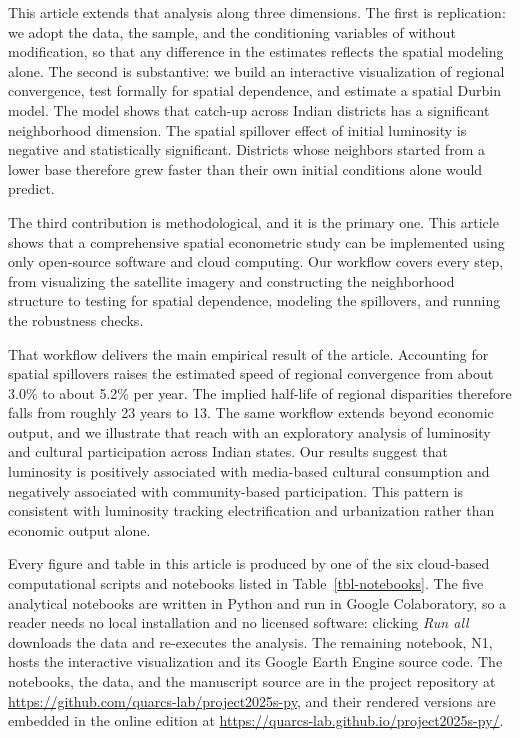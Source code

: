 \documentclass[
  a4paper, 
  twoside,
  final
]{article}
\newcounter{code}
\begin{document}
This article extends that analysis along three dimensions. The first is
replication: we adopt the data, the sample, and the conditioning
variables of \citet{chanda_kabiraj_district_convergence} without
modification, so that any difference in the estimates reflects the
spatial modeling alone. The second is substantive: we build an
interactive visualization of regional convergence, test formally for
spatial dependence, and estimate a spatial Durbin model. The model shows
that catch-up across Indian districts has a significant neighborhood
dimension. The spatial spillover effect of initial luminosity is
negative and statistically significant. Districts whose neighbors
started from a lower base therefore grew faster than their own initial
conditions alone would predict.

The third contribution is methodological, and it is the primary one.
This article shows that a comprehensive spatial econometric study can be
implemented using only open-source software and cloud computing. Our
workflow covers every step, from visualizing the satellite imagery and
constructing the neighborhood structure to testing for spatial
dependence, modeling the spillovers, and running the robustness checks.

That workflow delivers the main empirical result of the article.
Accounting for spatial spillovers raises the estimated speed of regional
convergence from about 3.0\% to about 5.2\% per year. The implied
half-life of regional disparities therefore falls from roughly 23 years
to 13. The same workflow extends beyond economic output, and we
illustrate that reach with an exploratory analysis of luminosity and
cultural participation across Indian states. Our results suggest that
luminosity is positively associated with media-based cultural
consumption and negatively associated with community-based
participation. This pattern is consistent with luminosity tracking
electrification and urbanization rather than economic output alone.

Every figure and table in this article is produced by one of the six
cloud-based computational scripts and notebooks listed in
Table~\ref{tbl-notebooks}. The five analytical notebooks are written in
Python and run in Google Colaboratory, so a reader needs no local
installation and no licensed software: clicking \emph{Run all} downloads
the data and re-executes the analysis. The remaining notebook, N1, hosts
the interactive visualization and its Google Earth Engine source code.
The notebooks, the data, and the manuscript source are in the project
repository at \url{https://github.com/quarcs-lab/project2025s-py}, and
their rendered versions are embedded in the online edition at
\url{https://quarcs-lab.github.io/project2025s-py/}.
\end{document}
